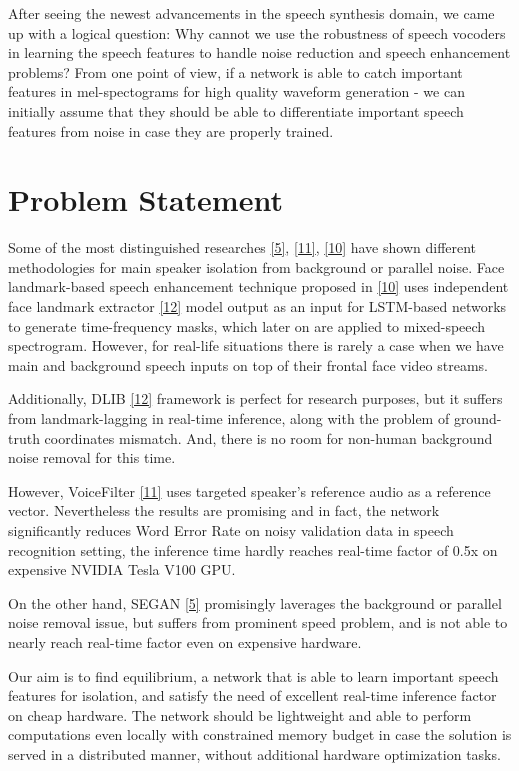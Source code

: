 \documentclass{article}
\begin{document}
After seeing the newest advancements in the speech synthesis domain, we came up with a logical question: Why cannot we use the robustness of speech vocoders in learning the speech features to handle noise reduction and speech enhancement problems? From one point of view, if a network is able to catch important features in mel-spectograms for high quality waveform generation - we can initially assume that they should be able to differentiate important speech features from noise in case they are properly trained.


\section{Problem Statement}

Some of the most distinguished researches  \hyperlink{refer}{[5]}, \hyperlink{refer}{[11]}, \hyperlink{refer}{[10]} have shown different methodologies for main speaker isolation from background or parallel noise. Face landmark-based speech enhancement technique proposed in \hyperlink{refer}{[10]} uses independent face landmark extractor  \hyperlink{refer}{[12]} model output as an input for LSTM-based networks to generate time-frequency masks, which later on are applied to mixed-speech spectrogram. However, for real-life situations there is rarely a case when we have main and background speech inputs on top of their frontal face video streams. 

\begin{flushleft}


Additionally, DLIB \hyperlink{refer}{[12]} framework is perfect for research purposes, but it suffers from landmark-lagging in real-time inference, along with the problem of ground-truth coordinates mismatch. And, there is no room for non-human background noise removal for this time.

However, VoiceFilter \hyperlink{refer}{[11]} uses targeted speaker's reference audio as a reference vector. Nevertheless the results are promising and in fact, the network significantly reduces Word Error Rate on noisy validation data in speech recognition setting, the inference time hardly reaches real-time factor of 0.5x on expensive NVIDIA Tesla V100 GPU.

On the other hand, SEGAN \hyperlink{refer}{[5]} promisingly laverages the background or parallel noise removal issue, but suffers from prominent speed problem, and is not able to nearly reach real-time factor even on expensive hardware.

Our aim is to find equilibrium, a network that is able to learn important speech features for isolation, and satisfy the need of excellent real-time inference factor on cheap hardware. The network should be lightweight and able to perform computations even locally with constrained memory budget in case the solution is served in a distributed manner, without additional hardware optimization tasks.


\end{flushleft}
\end{document}
